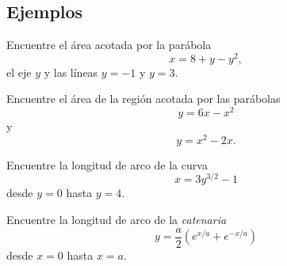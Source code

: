 \subsection{Ejemplos}


	\begin{problema} %
		Encuentre el área acotada por la parábola \[ x=8+y-y^2 , \] el eje $ y $ y las líneas $ y=-1 $ y $ y=3. $
	\end{problema}



	\begin{problema}
		
		Encuentre el área de la región acotada por las parábolas \[ y= 6x-x^2 \] y \[ y=x^2-2x. \]
	\end{problema}



	\begin{problema}
		Encuentre la longitud de arco de la curva \[ x=3y^{3/2}-1 \] desde $ y=0 $ hasta $ y=4 .$
	\end{problema}



	\begin{problema}
		Encuentre la longitud de arco de la \emph{catenaria} \[ y=\dfrac{a}{2}\left(e^{x/a} + e^{-x/a}\right) \] desde $ x=0 $ hasta $ x=a $.
	\end{problema}
